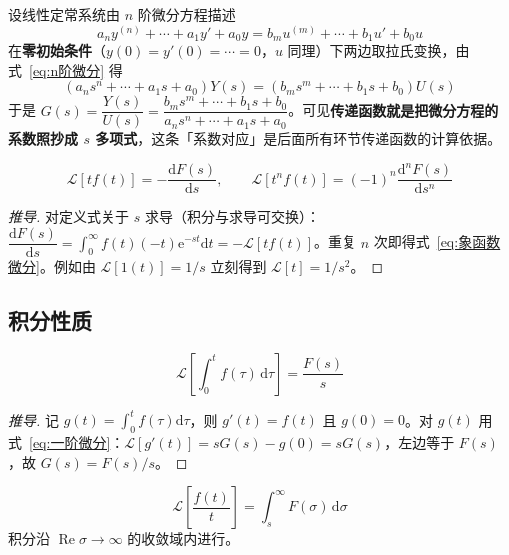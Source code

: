 \begin{keybox}[这一步就是传递函数的来源]
设线性定常系统由 $n$ 阶微分方程描述
\[
a_ny^{(n)}+\cdots+a_1y'+a_0y=b_mu^{(m)}+\cdots+b_1u'+b_0u
\]
在\textbf{零初始条件}（$y(0)=y'(0)=\cdots=0$，$u$ 同理）下两边取拉氏变换，由式~\eqref{eq:n阶微分} 得
\[
\left(a_ns^{n}+\cdots+a_1s+a_0\right)Y(s)=\left(b_ms^{m}+\cdots+b_1s+b_0\right)U(s)
\]
于是 $G(s)=\dfrac{Y(s)}{U(s)}=\dfrac{b_ms^{m}+\cdots+b_1s+b_0}{a_ns^{n}+\cdots+a_1s+a_0}$。可见\textbf{传递函数就是把微分方程的系数照抄成 $s$ 多项式}，这条「系数对应」是后面所有环节传递函数的计算依据。
\end{keybox}

\begin{property}[象函数微分]
\begin{equation}
\mathcal{L}\left[tf(t)\right]=-\frac{\mathrm{d}F(s)}{\mathrm{d}s},\qquad
\mathcal{L}\left[t^{n}f(t)\right]=(-1)^{n}\frac{\mathrm{d}^{n}F(s)}{\mathrm{d}s^{n}}
\label{eq:象函数微分}
\end{equation}
\end{property}

\begin{proof}[推导]
对定义式关于 $s$ 求导（积分与求导可交换）：$\dfrac{\mathrm{d}F(s)}{\mathrm{d}s}=\int_{0}^{\infty}f(t)\left(-t\right)\mathrm{e}^{-st}\mathrm{d}t=-\mathcal{L}\left[tf(t)\right]$。重复 $n$ 次即得式~\eqref{eq:象函数微分}。例如由 $\mathcal{L}[1(t)]=1/s$ 立刻得到 $\mathcal{L}[t]=1/s^{2}$。
\end{proof}

\subsection{积分性质}

\begin{property}[时域积分]
\begin{equation}
\mathcal{L}\left[\int_{0}^{t}f(\tau)\,\mathrm{d}\tau\right]=\frac{F(s)}{s}
\label{eq:时域积分}
\end{equation}
\end{property}

\begin{proof}[推导]
记 $g(t)=\int_{0}^{t}f(\tau)\mathrm{d}\tau$，则 $g'(t)=f(t)$ 且 $g(0)=0$。对 $g(t)$ 用式~\eqref{eq:一阶微分}：$\mathcal{L}[g'(t)]=sG(s)-g(0)=sG(s)$，左边等于 $F(s)$，故 $G(s)=F(s)/s$。
\end{proof}

\begin{property}[象函数积分]
\begin{equation}
\mathcal{L}\left[\frac{f(t)}{t}\right]=\int_{s}^{\infty}F(\sigma)\,\mathrm{d}\sigma
\label{eq:象函数积分}
\end{equation}
积分沿 $\operatorname{Re}\sigma\to\infty$ 的收敛域内进行。
\end{property}

